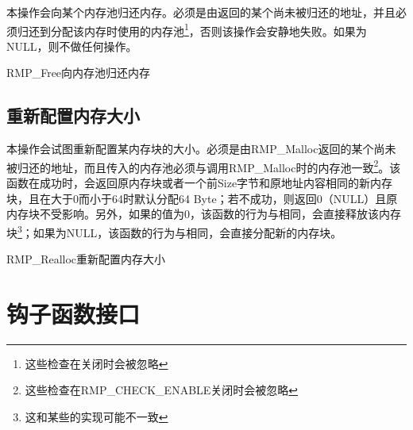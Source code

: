 本操作会向某个内存池归还内存。必须是由返回的某个尚未被归还的地址，并且必须归还到分配该内存时使用的内存池\footnote{这些检查在关闭时会被忽略}，否则该操作会安静地失败。如果为NULL，则不做任何操作。

\begin{apidesc}{RMP\_Free}{向内存池归还内存}
    \begin{apiparams}
    \end{apiparams}
    \begin{apiret}
    \end{apiret}
\end{apidesc}

\subsection{重新配置内存大小}\label{subsec:resize-a-memory-block}

本操作会试图重新配置某内存块的大小。必须是由RMP\_Malloc返回的某个尚未被归还的地址，而且传入的内存池必须与调用RMP\_Malloc时的内存池一致\footnote{这些检查在RMP\_CHECK\_ENABLE关闭时会被忽略}。该函数在成功时，会返回原内存块或者一个前Size字节和原地址内容相同的新内存块，且在大于0而小于64时默认分配64
Byte；若不成功，则返回0（NULL）且原内存块不受影响。另外，如果的值为0，该函数的行为与相同，会直接释放该内存块\footnote{这和某些的实现可能不一致}；如果为NULL，该函数的行为与相同，会直接分配新的内存块。

\begin{apidesc}{RMP\_Realloc}{重新配置内存大小}
    \begin{apiparams}
    \end{apiparams}
    \begin{apiret}
    \end{apiret}
\end{apidesc}

\section{钩子函数接口}\label{sec:hook-function-interface}

